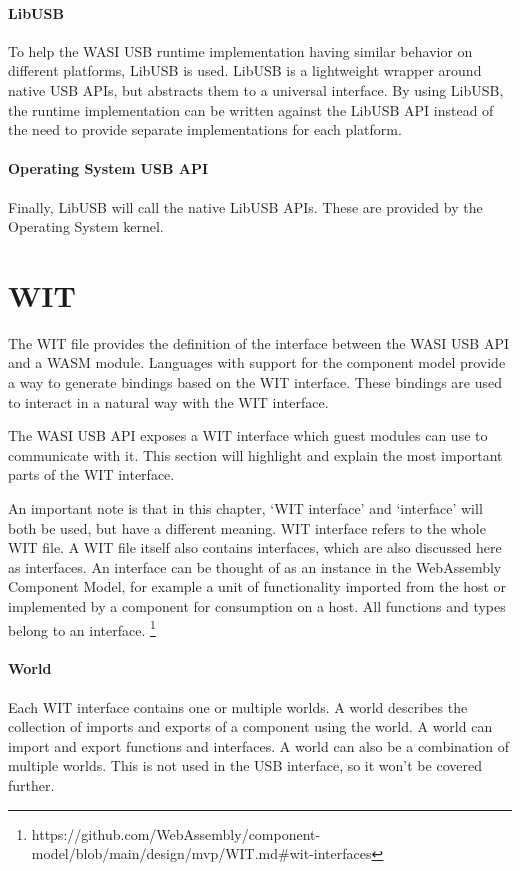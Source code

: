 \paragraph{LibUSB} To help the WASI USB runtime implementation having similar behavior on different platforms, LibUSB is used. LibUSB is a lightweight wrapper around native USB APIs, but abstracts them to a universal interface. By using LibUSB, the runtime implementation can be written against the LibUSB API instead of the need to provide separate implementations for each platform.

\paragraph{Operating System USB API} Finally, LibUSB will call the native LibUSB APIs. These are provided by the Operating System kernel.

\section{\acrfull{WIT}}
The WIT file provides the definition of the interface between the WASI USB API and a WASM module. Languages with support for the component model provide a way to generate bindings based on the WIT interface. These bindings are used to interact in a natural way with the WIT interface.

The WASI USB API exposes a WIT interface which guest modules can use to communicate with it. This section will highlight and explain the most important parts of the WIT interface.

An important note is that in this chapter, `WIT interface' and `interface' will both be used, but have a different meaning.
WIT interface refers to the whole WIT file.
A WIT file itself also contains interfaces, which are also discussed here as interfaces. An interface can be thought of as an instance in the WebAssembly Component Model, for example a unit of functionality imported from the host or implemented by a component for consumption on a host. All functions and types belong to an interface. \footnote{https://github.com/WebAssembly/component-model/blob/main/design/mvp/WIT.md\#wit-interfaces}

\paragraph{World}

Each WIT interface contains one or multiple worlds. A world describes the collection of imports and exports of a component using the world. A world can import and export functions and interfaces. A world can also be a combination of multiple worlds. This is not used in the USB interface, so it won't be covered further.


